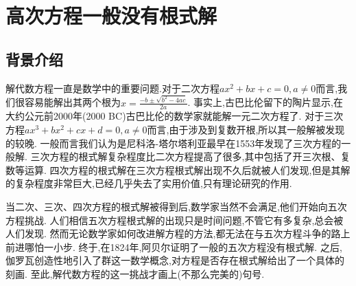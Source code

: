 \documentclass[main]{subfiles}
\begin{document}
\renewcommand{\filename}{No.9Theorem}%
\section{高次方程一般没有根式解}
\subsection{背景介绍}
解代数方程一直是数学中的重要问题.对于二次方程\(ax^2+bx+c=0,a \neq 0\)而言,我们很容易能解出其两个根为\(x= \frac{-b \pm \sqrt{b^2-4ac}}{2a}\).
事实上,古巴比伦留下的陶片显示,在大约公元前2000年(2000 BC)古巴比伦的数学家就能解一元二次方程了.
对于三次方程\(ax^3+bx^2+cx+d=0,a \neq 0\)而言,由于涉及到复数开根,所以其一般解被发现的较晚.
一般而言我们认为是尼科洛-塔尔塔利亚最早在1553年发现了三次方程的一般解.
三次方程的根式解复杂程度比二次方程提高了很多,其中包括了开三次根、复数等运算.
四次方程的根式解在三次方程根式解出现不久后就被人们发现,但是其解的复杂程度非常巨大,已经几乎失去了实用价值,只有理论研究的作用.

当二次、三次、四次方程的根式解被得到后,数学家当然不会满足,他们开始向五次方程挑战.
人们相信五次方程根式解的出现只是时间问题,不管它有多复杂,总会被人们发现.
然而无论数学家如何改进解方程的方法,都无法在与五次方程斗争的路上前进哪怕一小步.
终于,在1824年,阿贝尔证明了一般的五次方程没有根式解.
之后,伽罗瓦创造性地引入了群这一数学概念,对方程是否存在根式解给出了一个具体的刻画.
至此,解代数方程的这一挑战才画上(不那么完美的)句号.
\end{document}

